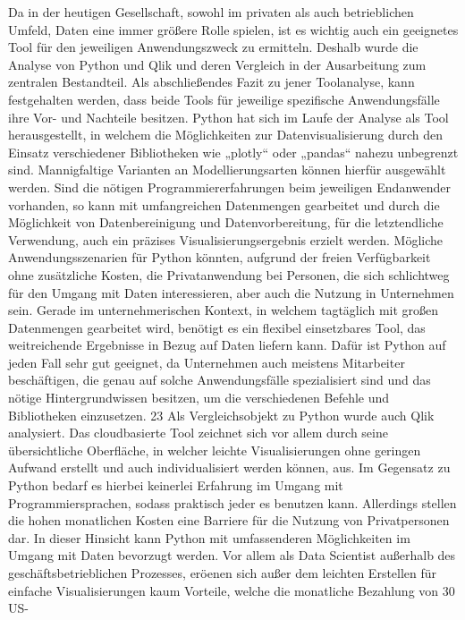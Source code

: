 \documentclass[12pt]{article}
\begin{document}
	Da in der heutigen Gesellschaft, sowohl im privaten als auch betrieblichen Umfeld,
	Daten eine immer größere Rolle spielen, ist es wichtig auch ein geeignetes Tool für den
	jeweiligen Anwendungszweck zu ermitteln.
	Deshalb wurde die Analyse von Python und Qlik und deren Vergleich in der Ausarbeitung
	zum zentralen Bestandteil.
	Als abschließendes Fazit zu jener Toolanalyse, kann festgehalten werden, dass beide
	Tools für jeweilige spezifische Anwendungsfälle ihre Vor- und Nachteile besitzen.
	Python hat sich im Laufe der Analyse als Tool herausgestellt, in welchem die
	Möglichkeiten zur Datenvisualisierung durch den Einsatz verschiedener Bibliotheken wie
	„plotly“ oder „pandas“ nahezu unbegrenzt sind.
	Mannigfaltige Varianten an Modellierungsarten können hierfür ausgewählt werden.
	Sind die nötigen Programmiererfahrungen beim jeweiligen Endanwender vorhanden, so
	kann mit umfangreichen Datenmengen gearbeitet und durch die Möglichkeit von
	Datenbereinigung und Datenvorbereitung, für die letztendliche Verwendung, auch ein
	präzises Visualisierungsergebnis erzielt werden.
	Mögliche Anwendungsszenarien für Python könnten, aufgrund der freien Verfügbarkeit
	ohne zusätzliche Kosten, die Privatanwendung bei Personen, die sich schlichtweg für
	den Umgang mit Daten interessieren, aber auch die Nutzung in Unternehmen sein.
	Gerade im unternehmerischen Kontext, in welchem tagtäglich mit großen Datenmengen
	gearbeitet wird, benötigt es ein flexibel einsetzbares Tool, das weitreichende Ergebnisse
	in Bezug auf Daten liefern kann. Dafür ist Python auf jeden Fall sehr gut geeignet, da
	Unternehmen auch meistens Mitarbeiter beschäftigen, die genau auf solche
	Anwendungsfälle spezialisiert sind und das nötige Hintergrundwissen besitzen, um die
	verschiedenen Befehle und Bibliotheken einzusetzen.
	23
	Als Vergleichsobjekt zu Python wurde auch Qlik analysiert. Das cloudbasierte Tool
	zeichnet sich vor allem durch seine übersichtliche Oberfläche, in welcher leichte
	Visualisierungen ohne geringen Aufwand erstellt und auch individualisiert werden
	können, aus. Im Gegensatz zu Python bedarf es hierbei keinerlei Erfahrung im Umgang
	mit Programmiersprachen, sodass praktisch jeder es benutzen kann.
	Allerdings stellen die hohen monatlichen Kosten eine Barriere für die Nutzung von
	Privatpersonen dar. In dieser Hinsicht kann Python mit umfassenderen Möglichkeiten im
	Umgang mit Daten bevorzugt werden. Vor allem als Data Scientist außerhalb des
	geschäftsbetrieblichen Prozesses, eröenen sich außer dem leichten Erstellen für
	einfache Visualisierungen kaum Vorteile, welche die monatliche Bezahlung von 30 US-
\end{document}

